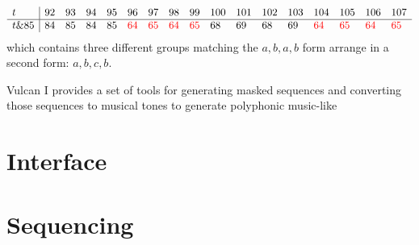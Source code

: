 \documentclass{article}
\begin{document}
$$
\begin{array}{l|llllllllllllllll}
t    & 92 & 93 & 94 & 95 & 96 & 97 & 98 & 99 & 100 & 101 & 102 & 103 & 104 & 105 & 106 & 107\\ \hline
t\&85 & 84 & 85 & 84 & 85 & \color{red}{64} & \color{red}{65} & \color{red}{64} & \color{red}{65} & 68 & 69 & 68 & 69 & \color{red}{64} & \color{red}{65} & \color{red}{64} & \color{red}{65}
\end{array}
$$
which contains three different groups matching the $a,b,a,b$ form arrange in a second form: $a,b,c,b$.

Vulcan I provides a set of tools for generating masked sequences and converting those sequences to musical tones to generate polyphonic music-like 

\section{Interface}

\section{Sequencing}
\end{document}
